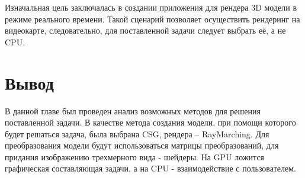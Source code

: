 Изначальная цель заключалась в создании приложения для рендера 3D модели в режиме реального времени.
Такой сценарий позволяет осуществить рендеринг на видеокарте, следовательно, для поставленной задачи следует выбрать её, а не CPU.  

\section{Вывод} \label{anl:algo_choice}
В данной главе был проведен анализ возможных методов для решения поставленной задачи. 
В качестве метода создания модели, при помощи которого будет решаться задача, была выбрана CSG,
рендера -- RayMarching. Для преобразования модели будут использоваться матрицы преобразований, для придания изображению
трехмерного вида - шейдеры. На GPU ложится графическая составляющая задачи, а на CPU -  взаимодействие с пользователем.


